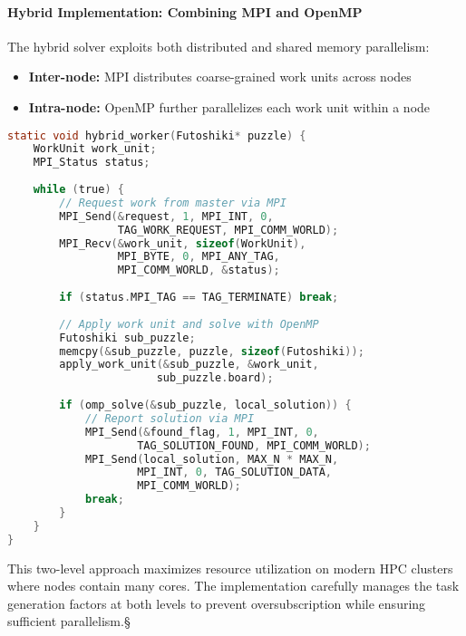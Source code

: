 \paragraph{Hybrid Implementation: Combining MPI and OpenMP}
\label{par:hybrid_implementation}
The hybrid solver exploits both distributed and shared memory parallelism:

\begin{itemize}
    \item \textbf{Inter-node:} MPI distributes coarse-grained work units across nodes
    \item \textbf{Intra-node:} OpenMP further parallelizes each work unit within a node
\end{itemize}

\begin{lstlisting}[language=C, caption=Hybrid worker with nested parallelism]
static void hybrid_worker(Futoshiki* puzzle) {
    WorkUnit work_unit;
    MPI_Status status;
    
    while (true) {
        // Request work from master via MPI
        MPI_Send(&request, 1, MPI_INT, 0, 
                 TAG_WORK_REQUEST, MPI_COMM_WORLD);
        MPI_Recv(&work_unit, sizeof(WorkUnit), 
                 MPI_BYTE, 0, MPI_ANY_TAG, 
                 MPI_COMM_WORLD, &status);
        
        if (status.MPI_TAG == TAG_TERMINATE) break;
        
        // Apply work unit and solve with OpenMP
        Futoshiki sub_puzzle;
        memcpy(&sub_puzzle, puzzle, sizeof(Futoshiki));
        apply_work_unit(&sub_puzzle, &work_unit, 
                       sub_puzzle.board);
        
        if (omp_solve(&sub_puzzle, local_solution)) {
            // Report solution via MPI
            MPI_Send(&found_flag, 1, MPI_INT, 0, 
                    TAG_SOLUTION_FOUND, MPI_COMM_WORLD);
            MPI_Send(local_solution, MAX_N * MAX_N, 
                    MPI_INT, 0, TAG_SOLUTION_DATA, 
                    MPI_COMM_WORLD);
            break;
        }
    }
}
\end{lstlisting}

This two-level approach maximizes resource utilization on modern HPC clusters where nodes contain many cores. The implementation carefully manages the task generation factors at both levels to prevent oversubscription while ensuring sufficient parallelism.§
